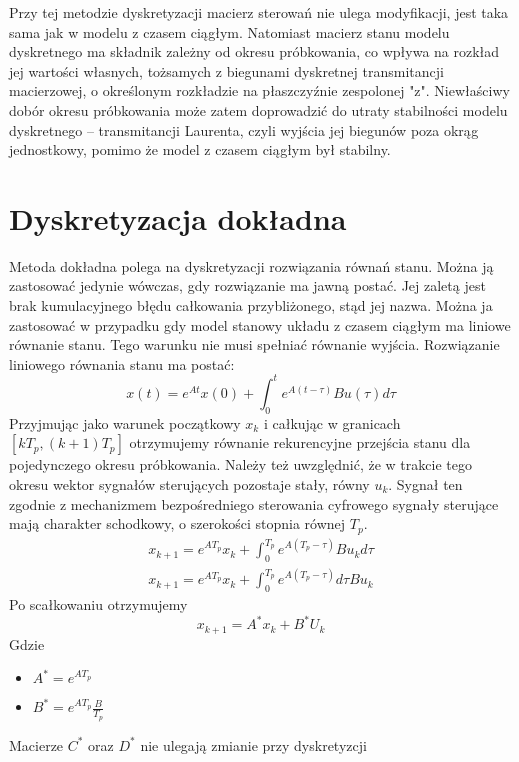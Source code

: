 \documentclass{article}
\begin{document}
		Przy tej metodzie dyskretyzacji macierz sterowań nie ulega modyfikacji, jest taka sama
		jak w modelu z czasem ciągłym. Natomiast macierz stanu modelu dyskretnego ma
		składnik zależny od okresu próbkowania, co wpływa na rozkład jej wartości własnych,
		tożsamych z biegunami dyskretnej transmitancji macierzowej, o określonym rozkładzie
		na płaszczyźnie zespolonej "z". Niewłaściwy dobór okresu próbkowania może zatem
		doprowadzić do utraty stabilności modelu dyskretnego – transmitancji Laurenta, czyli
		wyjścia jej biegunów poza okrąg jednostkowy, pomimo że model z czasem ciągłym był
		stabilny.
	\section{Dyskretyzacja dokładna}
		Metoda dokładna polega na dyskretyzacji rozwiązania równań stanu. Można ją
		zastosować jedynie wówczas, gdy rozwiązanie ma jawną postać. Jej zaletą jest brak
		kumulacyjnego błędu całkowania przybliżonego, stąd jej nazwa. Można ja zastosować w
		przypadku gdy model stanowy układu z czasem ciągłym ma liniowe równanie stanu.
		Tego warunku nie musi spełniać równanie wyjścia. Rozwiązanie liniowego równania
		stanu ma postać:
		\begin{equation}
			x(t) = e^{At}x(0)+\int^t_0e^{A(t-\tau)}Bu(\tau)d\tau
		\end{equation}
		Przyjmując jako warunek początkowy $x_k$ i całkując w granicach $[kT_p , (k+1)T_p]$
		otrzymujemy równanie rekurencyjne przejścia stanu dla pojedynczego okresu
		próbkowania. Należy też uwzględnić, że w trakcie tego okresu wektor sygnałów sterujących 
		pozostaje stały, równy $u_k$. Sygnał ten zgodnie z mechanizmem bezpośredniego
		sterowania cyfrowego sygnały sterujące mają charakter schodkowy, o szerokości stopnia
		równej $T_p$.
		\begin{align*}
			x_{k+1} = e^{AT_p}x_k+\int^{T_p}_0e^{A(T_p-\tau)}Bu_kd\tau \\
			x_{k+1} = e^{AT_p}x_k+\int^{T_p}_0 e^{A(T_p-\tau)}d\tau Bu_k
		\end{align*}
		Po scałkowaniu otrzymujemy
		\begin{equation}
			x_{k+1} = A^*x_k+B^*U_k
		\end{equation}
		Gdzie
		\begin{itemize}
			\item $A^* = e^{AT_p}$
			\item $B^* = e^{AT_p}\frac{B}{T_p}$
		\end{itemize}
		Macierze $C^*$ oraz $D^*$ nie ulegają zmianie przy dyskretyzcji
\end{document}
